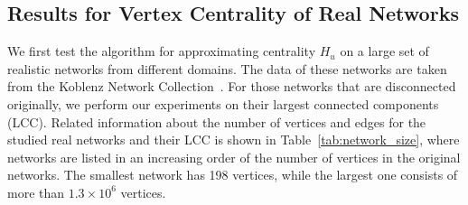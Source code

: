 \documentclass[journal]{IEEEtran}
\begin{document}
\subsection{Results for Vertex Centrality of Real Networks }

We first test the algorithm for approximating  centrality \(H_u\) on a large set of  realistic  networks from different domains.  The  data of these networks are taken from the Koblenz Network Collection~\cite{Ku13}. For those networks that are disconnected originally, we perform our experiments on their largest connected components (LCC). Related information about the number of vertices and edges for the studied real networks and their LCC  is  shown  in Table~\ref{tab:network_size},  where networks are listed in an increasing order of the number of vertices in the original networks. The smallest network has 198 vertices, while the largest one consists of more than \(1.3 \times 10^{6}\) vertices.
\end{document}
